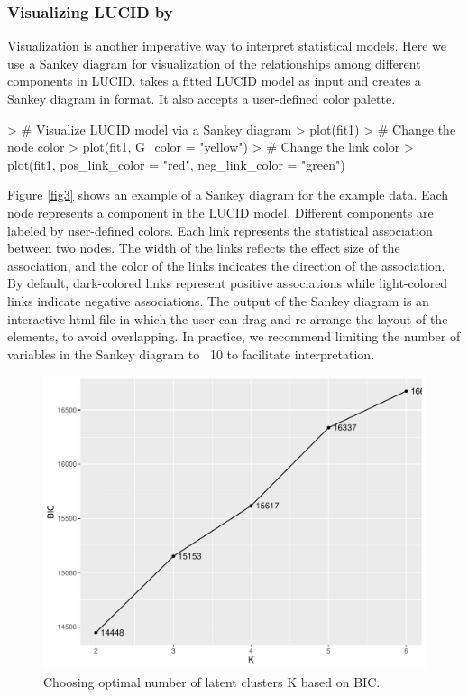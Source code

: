 \subsubsection{Visualizing LUCID by } \label{sec3.2.2}
Visualization is another imperative way to interpret statistical models. Here we use a Sankey diagram \citep{schmidt2008sankey} for visualization of the relationships among different components in LUCID.  takes a fitted LUCID model as input and creates a Sankey diagram in  format. It also accepts a user-defined color palette. 
\begin{example}
> # Visualize LUCID model via a Sankey diagram
> plot(fit1)
> # Change the node color
> plot(fit1, G_color = "yellow")
> # Change the link color
> plot(fit1, pos_link_color = "red", neg_link_color = "green")
\end{example}
Figure \ref{fig3} shows an example of a Sankey diagram for the example data. Each node represents a component in the LUCID model. Different components are labeled by user-defined colors. Each link represents the statistical association between two nodes. The width of the links reflects the effect size of the association, and the color of the links indicates the direction of the  association. By default, dark-colored links represent positive associations while light-colored links indicate negative associations. The output of the Sankey diagram is an interactive html file in which the user can drag and re-arrange the layout of the elements, to avoid overlapping. In practice, we recommend limiting the number of variables in the Sankey diagram to ~10 to facilitate interpretation.

\begin{figure}[]
    \centering
    \includegraphics[scale = 0.6]{figures/fig4.pdf}
    \caption{Choosing optimal number of latent clusters K based on BIC.}
    \label{fig4}
\end{figure}
